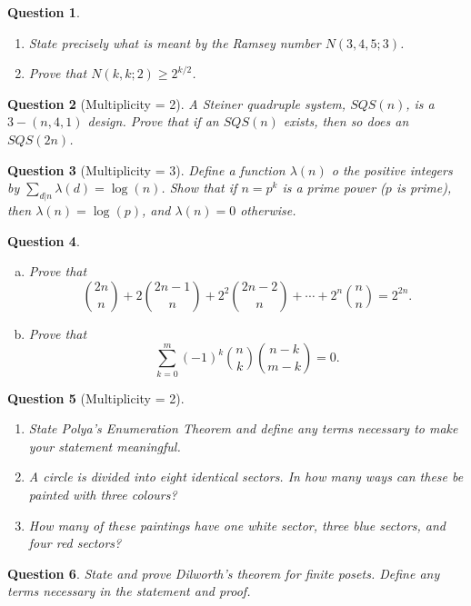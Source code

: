 \documentclass[12]{article}
\newtheorem{question}{Question}
\theoremstyle{definition}
\begin{document}
	\begin{question}
		\
		\begin{enumerate}
			\item State precisely what is meant by the Ramsey number $N(3,4,5;3)$.
			\item Prove that $N(k,k;2) \geq 2^{k/2}$.
		\end{enumerate}
	\end{question}
	
	\begin{question}[Multiplicity = 2]
		A Steiner quadruple system, $SQS(n)$, is a $3-(n,4,1)$ design.  Prove that if an $SQS(n)$ exists, then so does an $SQS(2n)$.
	\end{question}

	\begin{question}[Multiplicity = 3]
		Define a function $\lambda(n)$ o the positive integers by $\sum_{d|n} \lambda(d) = \log(n)$.  Show that if $n =  p^k$ is a prime power ($p$ is prime), then $\lambda(n) = \log(p)$, and $\lambda(n) = 0$ otherwise.
	\end{question}

	\begin{question}
		\
		\begin{enumerate}[a)]
			\item Prove that
			$$ {2n \choose n} + 2{2n-1 \choose n} + 2^2{2n - 2 \choose n} + \cdots + 2^n{n \choose n} = 2^{2n}.$$
			\item Prove that
			$$ \sum_{k=0}^m (-1)^k{n \choose k} {n-k \choose m-k} = 0.$$
		\end{enumerate}
	\end{question}

	\begin{question}[Multiplicity = 2]
		\
		\begin{enumerate}
			\item State Polya's Enumeration Theorem and define any terms necessary to make your statement meaningful.
			\item A circle is divided into eight identical sectors.  In how many ways can these be painted with three colours?
			\item How many of these paintings have one white sector, three blue sectors, and four red sectors?
		\end{enumerate}
	\end{question}

	\begin{question}
		State and prove Dilworth's theorem for finite posets.  Define any terms necessary in the statement and proof.
	\end{question}
\end{document}
